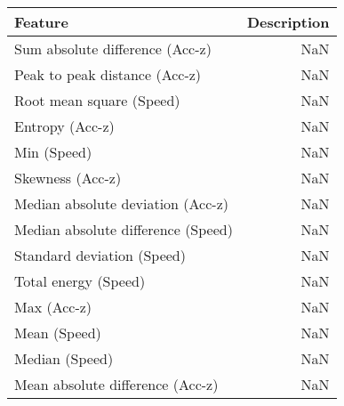 \begin{table}
\centering
\label{table:reg_fs}
\begin{tabular}{lr}
\toprule
                  \textbf{Feature} & \textbf{Description} \\
\midrule
   Sum absolute difference (Acc-z) &                  NaN \\
     Peak to peak distance (Acc-z) &                  NaN \\
          Root mean square (Speed) &                  NaN \\
                   Entropy (Acc-z) &                  NaN \\
                       Min (Speed) &                  NaN \\
                  Skewness (Acc-z) &                  NaN \\
 Median absolute deviation (Acc-z) &                  NaN \\
Median absolute difference (Speed) &                  NaN \\
        Standard deviation (Speed) &                  NaN \\
              Total energy (Speed) &                  NaN \\
                       Max (Acc-z) &                  NaN \\
                      Mean (Speed) &                  NaN \\
                    Median (Speed) &                  NaN \\
  Mean absolute difference (Acc-z) &                  NaN \\
\bottomrule
\end{tabular}
\end{table}
